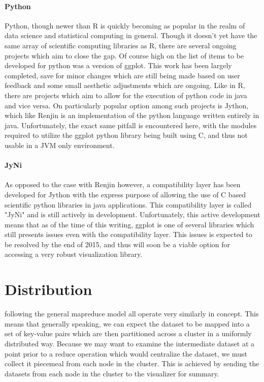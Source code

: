 \paragraph{Python}
Python, though newer than R is quickly becoming as popular in the realm of data science and statistical computing in general. Though it doesn't yet have the same array of scientific computing libraries as R, there are several ongoing projects which aim to close the gap. Of course high on the list of items to be developed for python was a version of ggplot. This work has been largely completed, save for minor changes which are still being made based on user feedback and some small aesthetic adjustments which are ongoing. Like in R, there are projects which aim to allow for the execution of python code in java and vice versa. On particularly popular option among such projects is Jython, which like Renjin is an implementation of the python language written entirely in java. Unfortunately, the exact same pitfall is encountered here, with the modules required to utilize the ggplot python library being built using C, and thus not usable in a JVM only environment. 

\paragraph{JyNi}
As opposed to the case with Renjin however, a compatibility layer has been developed for Jython with the express purpose of allowing the use of C based scientific python libraries in java applications. This compatibility layer is called "JyNi" \cite{RichtHoffer2013} and is still actively in development. Unfortunately, this active development means that as of the time of this writing, ggplot is one of several libraries which still presents issues even with the compatibility layer. This issues is expected to be resolved by the end of 2015, and thus will soon be a viable option for accessing a very robust visualization library.

\section{Distribution}
\label{sec:distribution}
 following the general mapreduce model all operate very similarly in concept. This means that generally speaking, we can expect the dataset to be mapped into a set of key-value pairs which are then partitioned across a cluster in a uniformly distributed way. Because we may want to examine the intermediate dataset at a point prior to a reduce operation which would centralize the dataset, we must collect it piecemeal from each node in the cluster. This is achieved by sending the datasets from each node in the cluster to the visualizer for summary. 


